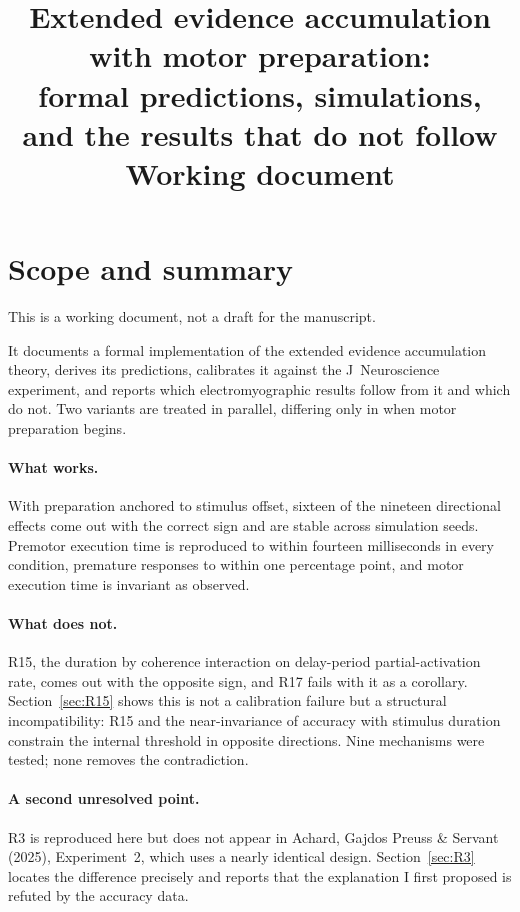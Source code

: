 \documentclass[11pt,a4paper]{article}
\title{Extended evidence accumulation with motor preparation:\\
formal predictions, simulations, and the results that do not follow\\
\large Working document}
\date{}
\theoremstyle{plain}
\theoremstyle{remark}
\begin{document}
\maketitle

\section{Scope and summary}

This is a working document, not a draft for the manuscript.

It documents a formal implementation of the extended evidence accumulation theory, derives
its predictions, calibrates it against the J~Neuroscience experiment, and reports which
electromyographic results follow from it and which do not. Two variants are treated in
parallel, differing only in when motor preparation begins.

\paragraph{What works.} With preparation anchored to stimulus offset, sixteen of the
nineteen directional effects come out with the correct sign and are stable across simulation
seeds. Premotor execution time is reproduced to within fourteen milliseconds in every
condition, premature responses to within one percentage point, and motor execution time is
invariant as observed.

\paragraph{What does not.} R15, the duration by coherence interaction on delay-period
partial-activation rate, comes out with the opposite sign, and R17 fails with it as a
corollary. Section~\ref{sec:R15} shows this is not a calibration failure but a structural
incompatibility: R15 and the near-invariance of accuracy with stimulus duration constrain
the internal threshold in opposite directions. Nine mechanisms were tested; none removes the
contradiction.

\paragraph{A second unresolved point.} R3 is reproduced here but does not appear in Achard,
Gajdos Preuss \& Servant (2025), Experiment~2, which uses a nearly identical design.
Section~\ref{sec:R3} locates the difference precisely and reports that the explanation I
first proposed is refuted by the accuracy data.
\end{document}
